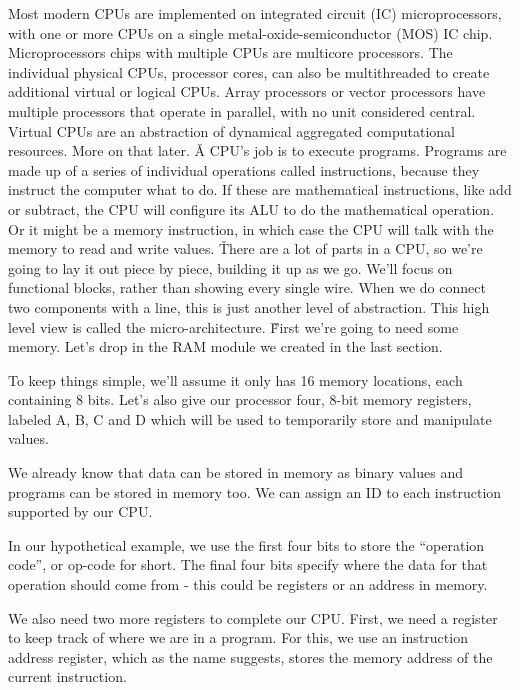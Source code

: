 Most modern CPUs are implemented on integrated circuit (IC) microprocessors, with one or more CPUs on a single
metal-oxide-semiconductor (MOS) IC chip. Microprocessors chips with multiple CPUs are multicore processors. The
individual physical CPUs, processor cores, can also be multithreaded to create additional virtual or logical CPUs.
Array processors or vector processors have multiple processors that operate in parallel, with no unit considered
central. Virtual CPUs are an abstraction of dynamical aggregated computational resources. More on that later. \v

A CPU's job is to execute programs. Programs are made up of a series of individual operations called instructions,
because they instruct the computer what to do. If these are mathematical instructions, like add or subtract, the CPU
will configure its ALU to do the mathematical operation. Or it might be a memory instruction, in which case the CPU
will talk with the memory to read and write values. \v

There are a lot of parts in a CPU, so we're going to lay it out piece by piece, building it up as we go. We'll focus
on functional blocks, rather than showing every single wire. When we do connect two components with a line, this is
just another level of abstraction. This high level view is called the micro-architecture. \v

First we're going to need some memory. Let's drop in the RAM module we created in the last section.

\be
To keep things simple, we'll assume it only has 16 memory locations, each containing 8 bits. Let's also give our
processor four, 8-bit memory registers, labeled A, B, C and D which will be used to temporarily store and manipulate
values.

\ee

We already know that data can be stored in memory as binary values and programs can be stored in memory too. We can
assign an ID to each instruction supported by our CPU\@.

\be
In our hypothetical example, we use the first four bits to store the ``operation code'', or op-code for short. The
final four bits specify where the data for that operation should come from - this could be registers or an address in
memory.

\ee

We also need two more registers to complete our CPU. First, we need a register to keep track of where we are in a
program. For this, we use an instruction address register, which as the name suggests, stores the memory address of
the current instruction.


